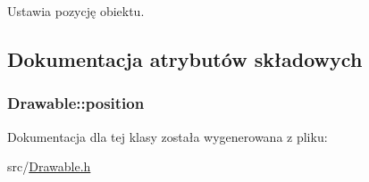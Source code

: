 Ustawia pozycję obiektu. 



\subsection{Dokumentacja atrybutów składowych}
\hypertarget{class_drawable_aaeba34b10714af371e05d44d825af8a5}{
\subsubsection[{position}]{ Drawable\-::position\hspace{0.3cm}{\ttfamily [protected]}}}\label{class_drawable_aaeba34b10714af371e05d44d825af8a5}


Dokumentacja dla tej klasy została wygenerowana z pliku\-:\begin{DoxyCompactItemize}
\item 
src/\hyperlink{_drawable_8h}{Drawable.\-h}\end{DoxyCompactItemize}
